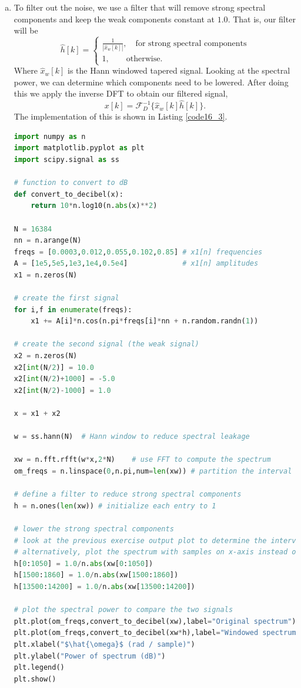 \begin{enumerate}
\begin{enumerate}[a)]
\item To filter out the noise, we use a filter that will remove strong spectral components and keep the weak components constant at $1.0$. That is, our filter will be
$$\hat{h}[k]=\begin{cases}
    \frac{1}{|\hat{x}_{w}[k]|}, \quad \text{for strong spectral components} \\
    1, \quad\quad \text{otherwise}.
\end{cases}$$
Where $\hat{x}_{w}[k]$ is the Hann windowed tapered signal. Looking at the spectral power, we can determine which components need to be lowered. 
After doing this we apply the inverse DFT to obtain our filtered signal,
$$x[k]=\mathcal{F}_{D}^{-1}\{\hat{x}_{w}[k]\hat{h}[k]\}.$$
The implementation of this is shown in Listing \ref{code16_3}.

\begin{lstlisting}[language=Python, caption=Filtering of the signal,label=code16_3]
import numpy as n
import matplotlib.pyplot as plt
import scipy.signal as ss

# function to convert to dB
def convert_to_decibel(x):
    return 10*n.log10(n.abs(x)**2)

N = 16384
nn = n.arange(N)
freqs = [0.0003,0.012,0.055,0.102,0.85] # x1[n] frequencies
A = [1e5,5e5,1e3,1e4,0.5e4]             # x1[n] amplitudes
x1 = n.zeros(N)

# create the first signal
for i,f in enumerate(freqs):
    x1 += A[i]*n.cos(n.pi*freqs[i]*nn + n.random.randn(1))

# create the second signal (the weak signal)
x2 = n.zeros(N)
x2[int(N/2)] = 10.0
x2[int(N/2)+1000] = -5.0
x2[int(N/2)-1000] = 1.0

x = x1 + x2

w = ss.hann(N)  # Hann window to reduce spectral leakage

xw = n.fft.rfft(w*x,2*N)    # use FFT to compute the spectrum
om_freqs = n.linspace(0,n.pi,num=len(xw)) # partition the interval (0,pi)

# define a filter to reduce strong spectral components
h = n.ones(len(xw)) # initialize each entry to 1

# lower the strong spectral components
# look at the previous exercise output plot to determine the intervals
# alternatively, plot the spectrum with samples on x-axis instead of \hat{\omega}
h[0:1050] = 1.0/n.abs(xw[0:1050])
h[1500:1860] = 1.0/n.abs(xw[1500:1860])
h[13500:14200] = 1.0/n.abs(xw[13500:14200])

# plot the spectral power to compare the two signals
plt.plot(om_freqs,convert_to_decibel(xw),label="Original spectrum")
plt.plot(om_freqs,convert_to_decibel(xw*h),label="Windowed spectrum")
plt.xlabel("$\hat{\omega}$ (rad / sample)")
plt.ylabel("Power of spectrum (dB)")
plt.legend()
plt.show()


\end{lstlisting}
\end{enumerate}
\end{enumerate}
